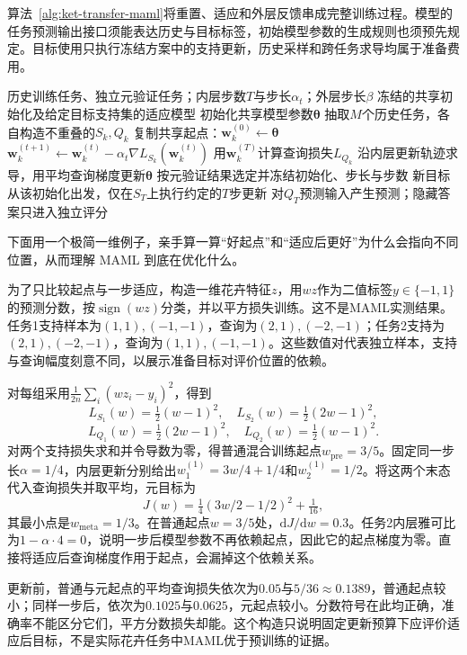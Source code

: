 算法~\ref{alg:ket-transfer-maml}将重置、适应和外层反馈串成完整训练过程。模型的任务预测输出接口须能表达历史与目标标签，初始模型参数的生成规则也须预先规定。目标使用只执行冻结方案中的支持更新，历史采样和跨任务求导均属于准备费用。

\begin{algorithm}[MAML的准备与目标适应]
  \label{alg:ket-transfer-maml}
  \begin{algorithmic}[1]
    \Require 历史训练任务、独立元验证任务；内层步数$T$与步长$\alpha_t$；外层步长$\beta$
    \Ensure 冻结的共享初始化及给定目标支持集的适应模型
    \State 初始化共享模型参数$\bm{\theta}$
      \State 抽取$M$个历史任务，各自构造不重叠的$S_k,Q_k$
        \State 复制共享起点：$\bm w_k^{(0)}\gets\bm{\theta}$
          \State $\bm w_k^{(t+1)}\gets\bm w_k^{(t)}
            -\alpha_t\nabla L_{S_k}(\bm w_k^{(t)})$
        \EndFor
        \State 用$\bm w_k^{(T)}$计算查询损失$L_{Q_k}$
      \EndFor
      \State 沿内层更新轨迹求导，用平均查询梯度更新$\bm{\theta}$
    \EndWhile
    \State 按元验证结果选定并冻结初始化、步长与步数
    \State 新目标从该初始化出发，仅在$S_T$上执行约定的$T$步更新
    \State 对$Q_T$预测输入产生预测；隐藏答案只进入独立评分
  \end{algorithmic}
\end{algorithm}

下面用一个极简一维例子，亲手算一算“好起点”和“适应后更好”为什么会指向不同位置，从而理解 MAML 到底在优化什么。
\begin{example}[同一组分类任务中的起点与适应后损失]
  \label{ex:ket-transfer-maml-numeric}
  为了只比较起点与一步适应，构造一维花卉特征$z$，用$wz$作为二值标签$y\in\{-1,1\}$的预测分数，按$\operatorname{sign}(wz)$分类，并以平方损失训练。这不是MAML实测结果。任务1支持样本为$(1,1),(-1,-1)$，查询为$(2,1),(-2,-1)$；任务2支持为$(2,1),(-2,-1)$，查询为$(1,1),(-1,-1)$。这些数值对代表独立样本，支持与查询幅度刻意不同，以展示准备目标对评价位置的依赖。

  对每组采用$\frac{1}{2n}\sum_i(wz_i-y_i)^2$，得到
  \[
    L_{S_1}(w)=\tfrac12(w-1)^2,\quad
    L_{S_2}(w)=\tfrac12(2w-1)^2,
  \]
  \[
    L_{Q_1}(w)=\tfrac12(2w-1)^2,\quad
    L_{Q_2}(w)=\tfrac12(w-1)^2.
  \]
  对两个支持损失求和并令导数为零，得普通混合训练起点$w_{\mathrm{pre}}=3/5$。固定同一步长$\alpha=1/4$，内层更新分别给出$w_1^{(1)}=3w/4+1/4$和$w_2^{(1)}=1/2$。将这两个末态代入查询损失并取平均，元目标为
  \[
    J(w)=\tfrac14(3w/2-1/2)^2+\tfrac1{16},
  \]
  其最小点是$w_{\mathrm{meta}}=1/3$。在普通起点$w=3/5$处，$\mathrm dJ/\mathrm dw=0.3$。任务2内层雅可比为$1-\alpha\cdot4=0$，说明一步后模型参数不再依赖起点，因此它的起点梯度为零。直接将适应后查询梯度作用于起点，会漏掉这个依赖关系。

  更新前，普通与元起点的平均查询损失依次为$0.05$与$5/36\approx0.1389$，普通起点较小；同样一步后，依次为$0.1025$与$0.0625$，元起点较小。分数符号在此均正确，准确率不能区分它们，平方分数损失却能。这个构造只说明固定更新预算下应评价适应后目标，不是实际花卉任务中MAML优于预训练的证据。
\end{example}

